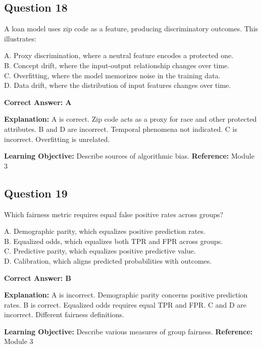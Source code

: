 \documentclass[11pt]{article}
\begin{document}
	\subsection*{Question 18}
	A loan model uses zip code as a feature, producing discriminatory
	outcomes. This illustrates:
	
	A. Proxy discrimination, where a neutral feature encodes a protected one.\\
	B. Concept drift, where the input-output relationship changes over time.\\
	C. Overfitting, where the model memorizes noise in the training data.\\
	D. Data drift, where the distribution of input features changes over time.
	
	\vspace{0.4em}
	\textbf{Correct Answer: A}
	
	\textbf{Explanation:}
	A is correct. Zip code acts as a proxy for race and other protected
	attributes.
	B and D are incorrect. Temporal phenomena not indicated.
	C is incorrect. Overfitting is unrelated.
	
	\textbf{Learning Objective:} Describe sources of algorithmic bias.
	\textbf{Reference:} Module 3
	
	\subsection*{Question 19}
	Which fairness metric requires equal false positive rates across groups?
	
	A. Demographic parity, which equalizes positive prediction rates.\\
	B. Equalized odds, which equalizes both TPR and FPR across groups.\\
	C. Predictive parity, which equalizes positive predictive value.\\
	D. Calibration, which aligns predicted probabilities with outcomes.
	
	\vspace{0.4em}
	\textbf{Correct Answer: B}
	
	\textbf{Explanation:}
	A is incorrect. Demographic parity concerns positive prediction rates.
	B is correct. Equalized odds requires equal TPR and FPR.
	C and D are incorrect. Different fairness definitions.
	
	\textbf{Learning Objective:} Describe various measures of group fairness.
	\textbf{Reference:} Module 3
	
\end{document}
